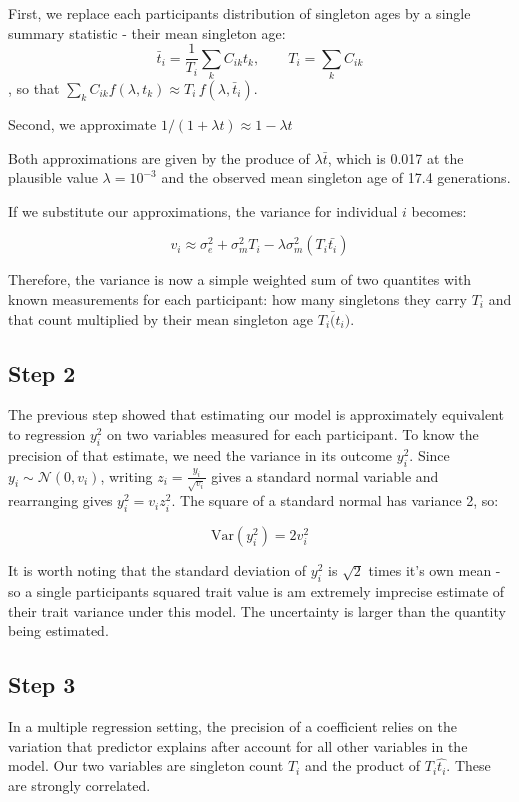 \documentclass{article}
\begin{document}
First, we replace each participants distribution of singleton ages by a single summary statistic - their mean singleton age: $$\bar t_i = \frac{1}{T_i}\sum_k C_{ik} t_k, \qquad T_i = \sum_k C_{ik}$$, so that $\sum_k C_{ik} f(\lambda, t_k) \approx T_i\, f(\lambda, \bar t_i)$.

Second, we approximate $1/(1+\lambda t) \approx 1-\lambda t$

Both approximations are given by the produce of $\lambda \bar t$, which is 0.017 at the plausible value $\lambda = 10^{-3}$ and the observed mean singleton age of 17.4 generations.

If we substitute our approximations, the variance for individual $i$ becomes:

\begin{equation}
    v_{i} \approx \sigma_e^2 + \sigma_m^2 T_{i} - \lambda \sigma_m^2 (T_{i} \bar{t_i})
\end{equation}

Therefore, the variance is now a simple weighted sum of two quantites with known measurements for each participant: how many singletons they carry $T_i$ and that count multiplied by their mean singleton age $T_{i} \bar(t_i)$.

\subsection{Step 2}

The previous step showed that estimating our model is approximately equivalent to regression $y^2_i$ on two variables measured for each participant. To know the precision of that estimate, we need the variance in its outcome $y^2_i$. Since $y_{i} \sim \mathcal{N}(0, v_{i})$, writing $z_i = \frac{y_i}{\sqrt{v_i}}$ gives a standard normal variable and rearranging gives $y_i^2 = v_i z_i^2$. The square of a standard normal has variance 2, so:

$$\mathrm{Var}(y_i^2) = 2 v_i^2$$

It is worth noting that the standard deviation of $y_{i}^2$ is $\sqrt{2}$ times it's own mean - so a single participants squared trait value is am extremely imprecise estimate of their trait variance under this model. The uncertainty is larger than the quantity being estimated.

\subsection{Step 3}

In a multiple regression setting, the precision of a coefficient relies on the variation that predictor explains after account for all other variables in the model. Our two variables are singleton count $T_{i}$ and the product of $T_{i} \hat{t_i}$. These are strongly correlated.
\end{document}
